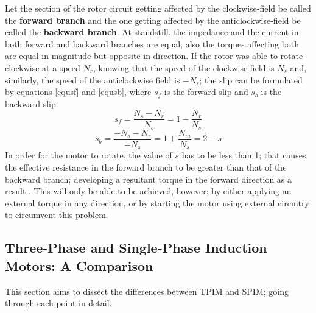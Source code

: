 \documentclass[journal]{IEEEtran}
\begin{document}
\newline
Let the section of the rotor circuit getting affected by the clockwise-field be called the \textbf{forward branch} and the one getting affected by the anticlockwise-field be called the \textbf{backward branch}. At standstill, the impedance and the current in both forward and backward branches are equal; also the torques affecting both are equal in magnitude but opposite in direction. If the rotor was able to rotate clockwise at a speed $N_r$, knowing that the speed of the clockwise field is $N_s$ and, similarly, the speed of the anticlockwise field is $-N_s$; the slip can be formulated by equations \ref{equsf} and \ref{equsb}, where $s_f$ is the forward slip and $s_b$ is the backward slip.
\begin{equation}
    s_f = \frac{N_s -  N_r}{N_s} = 1- \frac{N_r}{N_s}
    \label{equsf}
\end{equation}
\begin{equation}
    s_b = \frac{-N_s - N_r}{-N_s} = 1 + \frac{N_m}{N_s} = 2 - s
    \label{equsb}
\end{equation}
In order for the motor to rotate, the value of $s$ has to be less than 1; that causes the effective resistance in the forward branch to be greater than that of the backward branch; developing a resultant torque in the forward direction as a result \cite{guru2007}. This will only be able to be achieved, however; by either applying an external torque in any direction, or by starting the motor using external circuitry to circumvent this problem.
\newline

\subsection{Three-Phase and Single-Phase Induction Motors: A Comparison}
This section aims to dissect the differences between TPIM and SPIM; going through each point in detail.
\end{document}
